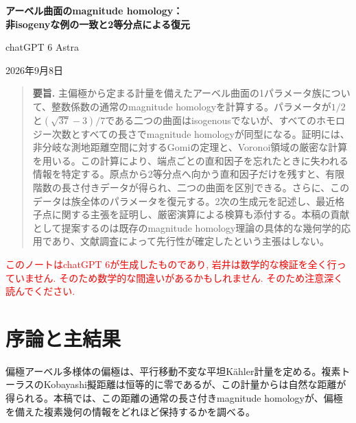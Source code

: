 \documentclass[12pt]{amsart}
\newcommand{\TheoremName}{Theorem}
\newcommand{\CorollaryName}{Corollary}
\newcommand{\PropositionName}{Proposition}
\newcommand{\LemmaName}{Lemma}
\newcommand{\DefinitionName}{Definition}
\newcommand{\RemarkName}{Remark}
\theoremstyle{definition}
\theoremstyle{remark}
\numberwithin{equation}{section}
\newcommand{\xr}[1]{\textcolor{red}{#1}}
\renewcommand{\theHsection}{en.\arabic{section}}
\renewcommand{\theHequation}{en.\arabic{section}.\arabic{equation}}
\providecommand{\theHthm}{en.\arabic{section}.\arabic{thm}}
\begin{document}
\newpage
\setcounter{section}{0}
\setcounter{equation}{0}
\setcounter{thm}{0}
\setcounter{table}{0}
\renewcommand{\theHsection}{ja.\arabic{section}}
\renewcommand{\theHequation}{ja.\arabic{section}.\arabic{equation}}
\renewcommand{\theHthm}{ja.\arabic{section}.\arabic{thm}}
\renewcommand{\theHtable}{ja.\arabic{table}}
\renewcommand{\refname}{参考文献}
\renewcommand{\proofname}{証明}
\renewcommand{\tablename}{表}
\renewcommand{\TheoremName}{定理}
\renewcommand{\CorollaryName}{系}
\renewcommand{\PropositionName}{命題}
\renewcommand{\LemmaName}{補題}
\renewcommand{\DefinitionName}{定義}
\renewcommand{\RemarkName}{注意}
\begin{center}
{\Large\bfseries アーベル曲面のmagnitude homology：\\[3pt]
非isogenyな例の一致と2等分点による復元}\par\medskip
chatGPT 6 Astra\par\smallskip
2026年9月8日
\end{center}
\begin{quote}\small
\textbf{要旨.}
主偏極から定まる計量を備えたアーベル曲面の1パラメータ族について、整数係数の通常のmagnitude homologyを計算する。パラメータが$1/2$と$(\sqrt{37}-3)/7$である二つの曲面はisogenousでないが、すべてのホモロジー次数とすべての長さでmagnitude homologyが同型になる。証明には、非分岐な測地距離空間に対するGomiの定理と、Voronoi領域の厳密な計算を用いる。この計算により、端点ごとの直和因子を忘れたときに失われる情報を特定する。原点から2等分点へ向かう直和因子だけを残すと、有限階数の長さ付きデータが得られ、二つの曲面を区別できる。さらに、このデータは族全体のパラメータを復元する。2次の生成元を記述し、最近格子点に関する主張を証明し、厳密演算による検算も添付する。本稿の貢献として提案するのは既存のmagnitude homology理論の具体的な幾何学的応用であり、文献調査によって先行性が確定したという主張はしない。
\end{quote}

\xr{このノートはchatGPT 6が生成したものであり, 岩井は数学的な検証を全く行っていません. そのため数学的な間違いがあるかもしれません. そのため注意深く読んでください.}

\section{序論と主結果}
偏極アーベル多様体の偏極は、平行移動不変な平坦K\"ahler計量を定める。複素トーラスのKobayashi擬距離は恒等的に零であるが、この計量からは自然な距離が得られる。本稿では、この距離の通常の長さ付きmagnitude homologyが、偏極を備えた複素幾何の情報をどれほど保持するかを調べる。
\end{document}
